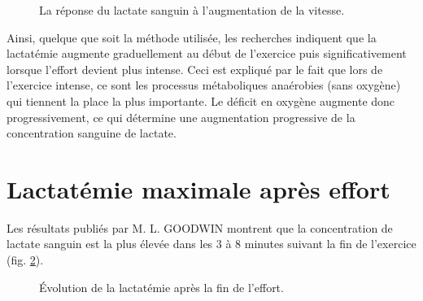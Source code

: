           \begin{figure}[H]
                \centering
                \caption{\label{fig:lactate_vitesse}
                La réponse du lactate sanguin à l'augmentation de la vitesse.}
        \end{figure}
        
       
        Ainsi, quelque que soit la méthode utilisée, les recherches indiquent que la lactatémie augmente graduellement au début de l'exercice puis significativement lorsque l'effort devient plus intense. Ceci est expliqué par le fait que lors de l'exercice intense, ce sont les processus métaboliques anaérobies (sans oxygène) qui tiennent la place la plus importante. Le déficit en oxygène augmente donc progressivement, ce qui détermine une augmentation progressive de la concentration sanguine de lactate.\\

        
    \section {Lactatémie maximale après effort}
    
        Les résultats publiés par M. L. GOODWIN \cite{goodwin07} montrent que la concentration de lactate sanguin est la plus élevée dans les 3 à 8 minutes suivant la fin de l'exercice (fig. \ref{fig:lactate_recup}).
            
            \begin{figure}[H]
                \centering
                \caption{\label{fig:lactate_recup} Évolution de la lactatémie après la fin de l'effort.}
             \end{figure}
            
